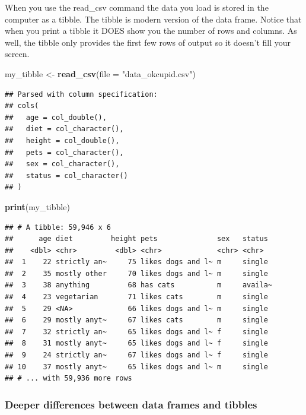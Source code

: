 \documentclass[
]{krantz}
\makeatletter
\newenvironment{Shaded}{\begin{snugshade}}{\end{snugshade}}
\newcommand{\DataTypeTok}[1]{\textcolor[rgb]{0.27,0.27,0.27}{#1}}
\newcommand{\KeywordTok}[1]{\textcolor[rgb]{0.27,0.27,0.27}{\textbf{#1}}}
\newcommand{\NormalTok}[1]{#1}
\newcommand{\StringTok}[1]{\textcolor[rgb]{0.5,0.5,0.5}{#1}}
\newenvironment{kframe}{%
\medskip{}
\setlength{\fboxsep}{.8em}
 \def\at@end@of@kframe{}%
 \ifinner\ifhmode%
  \def\at@end@of@kframe{\end{minipage}}%
  \begin{minipage}{\columnwidth}%
 \fi\fi%
 \def\FrameCommand##1{\hskip\@totalleftmargin \hskip-\fboxsep
 \colorbox{shadecolor}{##1}\hskip-\fboxsep
     \hskip-\linewidth \hskip-\@totalleftmargin \hskip\columnwidth}%
 \MakeFramed {\advance\hsize-\width
   \@totalleftmargin\z@ \linewidth\hsize
   \@setminipage}}%
 {\par\unskip\endMakeFramed%
 \at@end@of@kframe}
\renewenvironment{Shaded}{\begin{kframe}}{\end{kframe}}
\makeatother
\begin{document}
When you use the read\_csv command the data you load is stored in the computer as a tibble. The tibble is modern version of the data frame. Notice that when you print a tibble it DOES show you the number of rows and columns. As well, the tibble only provides the first few rows of output so it doesn't fill your screen.

\begin{Shaded}
\begin{Highlighting}[]
\NormalTok{my_tibble <-}\StringTok{ }\KeywordTok{read_csv}\NormalTok{(}\DataTypeTok{file =} \StringTok{"data_okcupid.csv"}\NormalTok{)}
\end{Highlighting}
\end{Shaded}

\begin{verbatim}
## Parsed with column specification:
## cols(
##   age = col_double(),
##   diet = col_character(),
##   height = col_double(),
##   pets = col_character(),
##   sex = col_character(),
##   status = col_character()
## )
\end{verbatim}

\begin{Shaded}
\begin{Highlighting}[]
\KeywordTok{print}\NormalTok{(my_tibble)}
\end{Highlighting}
\end{Shaded}

\begin{verbatim}
## # A tibble: 59,946 x 6
##      age diet         height pets              sex   status 
##    <dbl> <chr>         <dbl> <chr>             <chr> <chr>  
##  1    22 strictly an~     75 likes dogs and l~ m     single 
##  2    35 mostly other     70 likes dogs and l~ m     single 
##  3    38 anything         68 has cats          m     availa~
##  4    23 vegetarian       71 likes cats        m     single 
##  5    29 <NA>             66 likes dogs and l~ m     single 
##  6    29 mostly anyt~     67 likes cats        m     single 
##  7    32 strictly an~     65 likes dogs and l~ f     single 
##  8    31 mostly anyt~     65 likes dogs and l~ f     single 
##  9    24 strictly an~     67 likes dogs and l~ f     single 
## 10    37 mostly anyt~     65 likes dogs and l~ m     single 
## # ... with 59,936 more rows
\end{verbatim}

\hypertarget{deeper-differences-between-data-frames-and-tibbles}{%
\subsubsection{Deeper differences between data frames and tibbles}\label{deeper-differences-between-data-frames-and-tibbles}}
\end{document}
